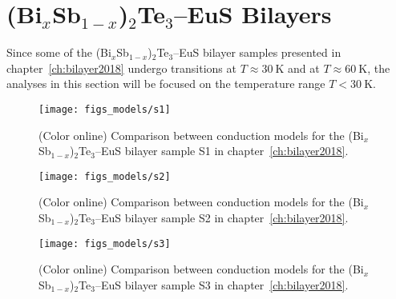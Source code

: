 \section{(Bi$_x$Sb$_{1-x}$)$_2$Te$_3$--EuS Bilayers}
Since some of the (Bi$_x$Sb$_{1-x}$)$_2$Te$_3$--EuS bilayer samples presented in chapter~\ref{ch:bilayer2018} undergo transitions at $T\approx 30~\mathrm{K}$ and at $T \approx 60~\mathrm{K}$, the analyses in this section will be focused on the temperature range $T < 30~\mathrm{K}$.
%
\begin{figure}[h!]%
    \centering%
    \texttt{[image: figs\_models/s1]}%
    \caption[Conduction model comparison: (Bi$_x$Sb$_{1-x}$)$_2$Te$_3$--EuS bilayer: S1]{\label{fig:models_s1}(Color online) Comparison between conduction models for the (Bi$_x$Sb$_{1-x}$)$_2$Te$_3$--EuS bilayer sample S1 in chapter~\ref{ch:bilayer2018}.}%
\end{figure}%
%
\begin{figure}[h!]%
    \centering%
    \texttt{[image: figs\_models/s2]}%
    \caption[Conduction model comparison: (Bi$_x$Sb$_{1-x}$)$_2$Te$_3$--EuS bilayer: S2]{\label{fig:models_s2}(Color online) Comparison between conduction models for the (Bi$_x$Sb$_{1-x}$)$_2$Te$_3$--EuS bilayer sample S2 in chapter~\ref{ch:bilayer2018}.}%
\end{figure}%
%
\begin{figure}[h!]%
    \centering%
    \texttt{[image: figs\_models/s3]}%
    \caption[Conduction model comparison: (Bi$_x$Sb$_{1-x}$)$_2$Te$_3$--EuS bilayer: S3]{\label{fig:models_s3}(Color online) Comparison between conduction models for the (Bi$_x$Sb$_{1-x}$)$_2$Te$_3$--EuS bilayer sample S3 in chapter~\ref{ch:bilayer2018}.}%
\end{figure}%